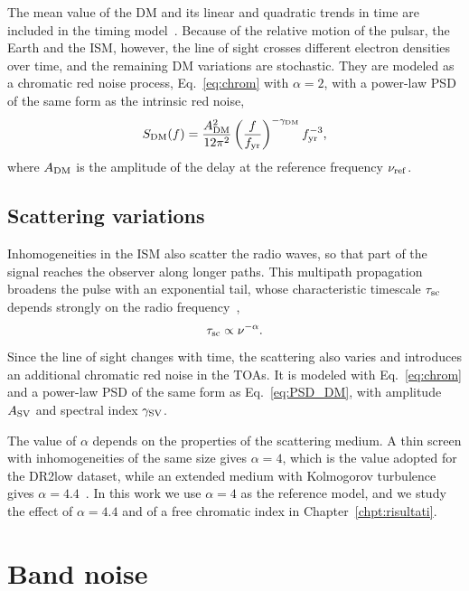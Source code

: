 The mean value of the DM and its linear and quadratic trends in time are
included in the timing model~\cite{Taylor2021}. Because of the relative motion of the pulsar,
the Earth and the ISM, however, the line of sight crosses different electron
densities over time, and the remaining DM variations are stochastic. They are
modeled as a chromatic red noise process, Eq.~\eqref{eq:chrom} with
$\alpha = 2$, with a power-law PSD of the same form as the intrinsic red noise,
\begin{equation}
    S_{\rm DM}(f) = \frac{A_{\rm DM}^2}{12\pi^2}
    \left(\frac{f}{f_{\mathrm{yr}}}\right)^{-\gamma_{\rm DM}}f_{\mathrm{yr}}^{-3},
    \label{eq:PSD_DM}
\end{equation}
where $A_{\rm DM}$ is the amplitude of the delay at the reference frequency
$\nu_{\rm ref}$.

\subsection{Scattering variations} \label{sec:sv}

Inhomogeneities in the ISM also scatter the radio waves, so that part of the
signal reaches the observer along longer paths. This multipath propagation
broadens the pulse with an exponential tail, whose characteristic timescale
$\tau_{\rm sc}$ depends strongly on the radio
frequency~\cite{Shaifullah2025},
\begin{equation}
    \tau_{\rm sc} \propto \nu^{-\alpha}.
    \label{eq:scattering}
\end{equation}
Since the line of sight changes with time, the scattering also varies and
introduces an additional chromatic red noise in the TOAs. It is modeled with
Eq.~\eqref{eq:chrom} and a power-law PSD of the same form as
Eq.~\eqref{eq:PSD_DM}, with amplitude $A_{\rm SV}$ and spectral index
$\gamma_{\rm SV}$.

The value of $\alpha$ depends on the properties of the scattering medium. A
thin screen with inhomogeneities of the same size gives $\alpha = 4$, which is
the value adopted for the DR2low dataset, while an extended medium with
Kolmogorov turbulence gives $\alpha = 4.4$~\cite{Iraci2025}. In this work we use $\alpha = 4$ as
the reference model, and we study the effect of $\alpha = 4.4$ and of a free
chromatic index in Chapter~\ref{chpt:risultati}.

\section{Band noise} \label{sec:bn}

